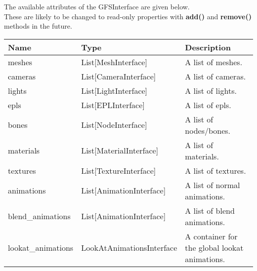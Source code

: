 \documentclass{article}
\begin{document}
The available attributes of the GFSInterface are given below.\\
These are likely to be changed to read-only properties with \textbf{add()} and \textbf{remove()} methods in the future.
\begin{center}
\begin{longtable}{p{}p{}p{}}
\hline
Name & Type & Description\\
\hline
meshes & List[MeshInterface] & A list of meshes.\\
cameras & List[CameraInterface] & A list of cameras.\\
lights & List[LightInterface] & A list of lights.\\
epls & List[EPLInterface] & A list of epls.\\
bones & List[NodeInterface] & A list of nodes/bones.\\
materials & List[MaterialInterface] & A list of materials.\\
textures & List[TextureInterface] & A list of textures.\\
animations & List[AnimationInterface] & A list of normal animations.\\
blend\_animations & List[AnimationInterface] & A list of blend animations.\\
lookat\_animations & LookAtAnimationsInterface & A container for the global lookat animations.\\
\hline
\end{longtable}
\end{center}
\end{document}
